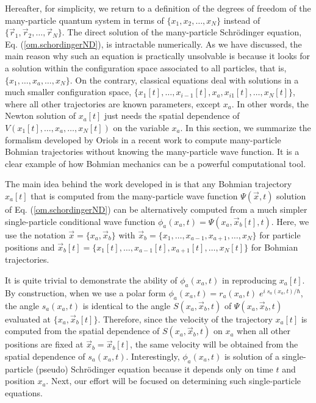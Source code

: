 \documentclass[onecolumn,nofootinbib, secnumarabic, amsmath, nobibnotes,12pt,aps,pra]{revtex4-1}
\newcommand{\eref}[1]{Eq. (\ref{#1})}
\begin{document}
Hereafter, for simplicity, we return to a definition of the degrees
of freedom of the many-particle quantum system in terms of 
$\{x_1, x_2,\ldots ,x_N\}$ instead of $\{ \vec r_1,\vec r_2, \ldots
,\vec r_N \}$. The direct solution of  the many-particle
Schr\"odinger equation, \eref{om.schordingerND}, is intractable
numerically. As we have discussed, the main reason why such an
equation is practically unsolvable is because it looks for a
solution within the configuration space associated to all particles,
that is, $\{x_1,\ldots,x_a,\ldots,x_N\}$. On the contrary, classical
equations  deal with solutions in a much smaller configuration
space,  $\{x_1[t],\ldots,x_{i -
1}[t],x_a,x_{i1}[t],\ldots,x_N[t]\}$, where all other trajectories
are known parameters, except $x_a$. In other words, the Newton
solution of $x_a[t]$ just needs the spatial dependence of
$V(x_1[t],\ldots,x_a,\ldots,x_N[t])$ on the variable $x_a$. In this
section, we summarize the formalism developed by Oriols in a recent work
\cite{om.oriolsprl} to compute many-particle Bohmian trajectories
without knowing the many-particle wave function. It is a clear
example of how Bohmian mechanics can be a powerful computational 
tool.

The main idea behind the work developed in \cite{om.oriolsprl} is
that any Bohmian trajectory $x_a[t]$ that is computed from the
many-particle wave function $\Psi(\vec x,t)$ solution of
\eref{om.schordingerND} can be alternatively computed from a much
simpler single-particle conditional wave function $\phi_a(x_a,t) = \Psi(x_a,\vec
x_b[t],t)$. Here, we use the notation $\vec x = \{x_a,\vec x_b\}$
with $\vec x_b = \{x_1,\ldots,x_{a-1},x_{a + 1},\ldots,x_N\}$ for
particle positions and $\vec x_b[t] =
\{x_1[t],\ldots,x_{a-1}[t],x_{a + 1}[t],\ldots,x_N[t]\}$ for Bohmian
trajectories.

It is quite trivial to demonstrate the ability of $\phi_a(x_a,t)$ in
reproducing $x_a[t]$. By construction, when we use a polar form
$\phi_a(x_a,t) = r_a(x_a,t) \; e^{i \; s_a(x_a,t)/\hbar}$, the angle
$s_a(x_a,t)$ is identical to the angle $S(x_a,\vec x_b,t)$ of
$\Psi(x_a,\vec x_b,t)$ evaluated at $\{x_a,\vec x_b[t]\}$.
Therefore, since the velocity of the trajectory $x_a[t]$ is computed
from the spatial dependence of $S(x_a,\vec x_b,t)$ on $x_a$ when all
other positions are fixed at $\vec x_b = \vec x_b[t]$, the same
velocity will be obtained from the spatial dependence of
$s_a(x_a,t)$. Interestingly, $\phi_a(x_a,t)$ is solution of a
single-particle (pseudo) Schr\"odinger equation because it depends
only on time $t$ and position $x_a$. Next, our effort will be
focused on determining such single-particle  equations.
\end{document}
